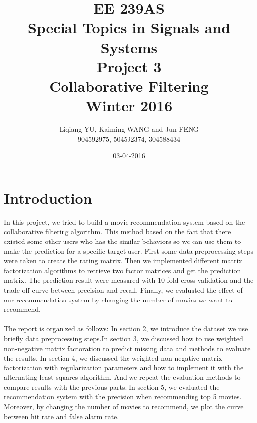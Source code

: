 \documentclass{article}
\begin{document}
\begin{titlepage}
\title{EE 239AS \\Special Topics in Signals and Systems\\Project 3\\Collaborative Filtering\\Winter 2016} 
\author{Liqiang YU, Kaiming WANG and Jun FENG\\
904592975, 504592374, 304588434} 
\date{03-04-2016}
\end{titlepage}

\maketitle
\newpage
\tableofcontents
\newpage
\section{Introduction}
In this project, we tried to build a movie recommendation system based on the collaborative filtering algorithm. This method based on the fact that there existed some other users who has the similar behaviors so we can use them to make the prediction for a specific target user. First some data preprocessing steps were taken to create the rating matrix. Then we implemented different matrix factorization algorithms to retrieve two factor matrices and get the prediction matrix. The prediction result were measured with 10-fold cross validation and the trade off curve between precision and recall. Finally, we evaluated the effect of our recommendation system by changing the number of movies we want to recommend.\\
\\
The report is organized as follows: In section 2, we introduce the dataset we use briefly data preprocessing steps.In section 3, we discussed how to use weighted non-negative matrix factoration to predict missing data and methods to evaluate the results. In section 4, we discussed the weighted non-negative matrix factorization with regularization parameters and how to implement it with the alternating least squares algorithm. And we repeat the evaluation methods to compare results with the previous parts. In section 5, we evaluated the recommendation system with the precision when recommending top 5 movies. Moreover, by changing the number of movies to recommend, we plot the curve between hit rate and false alarm rate. 
\end{document}
